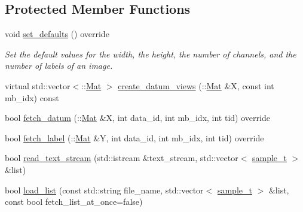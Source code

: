 \subsection*{Protected Member Functions}
\begin{DoxyCompactItemize}
\item 
void \hyperlink{classlbann_1_1data__reader__multi__images_a5abe6981d750bc145e50f6141772805c}{set\+\_\+defaults} () override
\begin{DoxyCompactList}\small\item\em Set the default values for the width, the height, the number of channels, and the number of labels of an image. \end{DoxyCompactList}\item 
virtual std\+::vector$<$\+::\hyperlink{base_8hpp_a68f11fdc31b62516cb310831bbe54d73}{Mat} $>$ \hyperlink{classlbann_1_1data__reader__multi__images_a713e4cc80a2d3a2b721d0912e3773baa}{create\+\_\+datum\+\_\+views} (\+::\hyperlink{base_8hpp_a68f11fdc31b62516cb310831bbe54d73}{Mat} \&X, const int mb\+\_\+idx) const
\item 
bool \hyperlink{classlbann_1_1data__reader__multi__images_a37ef2f4e641c074d0f3bd51f11682fc7}{fetch\+\_\+datum} (\+::\hyperlink{base_8hpp_a68f11fdc31b62516cb310831bbe54d73}{Mat} \&X, int data\+\_\+id, int mb\+\_\+idx, int tid) override
\item 
bool \hyperlink{classlbann_1_1data__reader__multi__images_a96baf61a6207a76060afeaa31b55b671}{fetch\+\_\+label} (\+::\hyperlink{base_8hpp_a68f11fdc31b62516cb310831bbe54d73}{Mat} \&Y, int data\+\_\+id, int mb\+\_\+idx, int tid) override
\item 
bool \hyperlink{classlbann_1_1data__reader__multi__images_a3160c8ee0e30304a1f5fc07d08e6cb40}{read\+\_\+text\+\_\+stream} (std\+::istream \&text\+\_\+stream, std\+::vector$<$ \hyperlink{classlbann_1_1data__reader__multi__images_a6cbb30001dd633b0d810c417cbbf441e}{sample\+\_\+t} $>$ \&list)
\item 
bool \hyperlink{classlbann_1_1data__reader__multi__images_a31763c860d3e3cc57a6af0158b9977f7}{load\+\_\+list} (const std\+::string file\+\_\+name, std\+::vector$<$ \hyperlink{classlbann_1_1data__reader__multi__images_a6cbb30001dd633b0d810c417cbbf441e}{sample\+\_\+t} $>$ \&list, const bool fetch\+\_\+list\+\_\+at\+\_\+once=false)
\end{DoxyCompactItemize}
